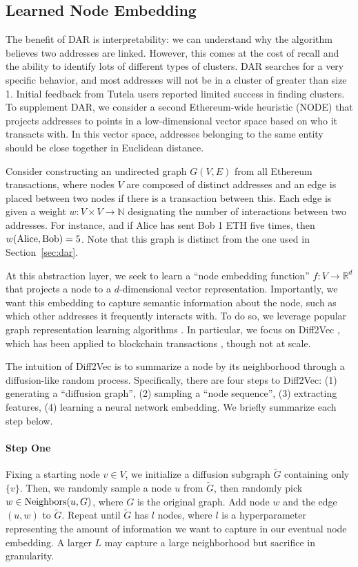 \documentclass[11pt,a4paper]{article}
\begin{document}
\subsection{Learned Node Embedding}

The benefit of DAR is interpretability: we can understand why the algorithm believes two addresses are linked. However, this comes at the cost of recall and the ability to identify lots of different types of clusters. DAR searches for a very specific behavior, and most addresses will not be in a cluster of greater than size 1. Initial feedback from Tutela users reported limited success in finding clusters.
To supplement DAR, we consider a second Ethereum-wide heuristic (NODE) that projects addresses to points in a low-dimensional vector space based on who it transacts with. In this vector space, addresses belonging to the same entity should be close together in Euclidean distance.

Consider constructing an undirected graph $G(V, E)$ from all Ethereum transactions, where nodes $V$ are composed of distinct addresses and an edge is placed between two nodes if there is a transaction between this. Each edge is given a weight $w: V \times V \rightarrow \mathbb{N}$ designating the number of interactions between two addresses. For instance, and if Alice has sent Bob 1 ETH five times,  then $w(\textup{Alice}, \textup{Bob}) = 5$. Note that this graph is distinct from the one used in Section~\ref{sec:dar}.

At this abstraction layer, we seek to learn a ``node embedding function'' $f: V \rightarrow \mathbb{R}^d$ that projects a node to a $d$-dimensional vector representation. Importantly, we want this embedding to capture semantic information about the node, such as which other addresses it frequently interacts with. To do so, we leverage popular graph representation learning algorithms \citep{grover2016node2vec,rozemberczki2018fast}. In particular, we focus on Diff2Vec \citep{rozemberczki2018fast}, which has been applied to blockchain transactions \citep{beres2021blockchain}, though not at scale.

The intuition of Diff2Vec is to summarize a node by its neighborhood through a diffusion-like random process. Specifically, there are four steps to Diff2Vec: (1) generating a ``diffusion graph'', (2) sampling a ``node sequence'', (3) extracting features, (4) learning a neural network embedding. We briefly summarize each step below.

\paragraph{Step One} Fixing a starting node $v \in V$, we initialize a diffusion subgraph $\tilde{G}$ containing only $\{v\}$. Then, we randomly sample a node $u$ from $\tilde{G}$, then randomly pick $w \in \textup{Neighbors}(u, G)$, where $G$ is the original graph. Add node $w$ and the edge $(u, w)$ to $\tilde{G}$. Repeat until $\tilde{G}$ has $l$ nodes, where $l$ is a hyperparameter representing the amount of information we want to capture in our eventual node embedding. A larger $L$ may capture a large neighborhood but sacrifice in granularity.
\end{document}
